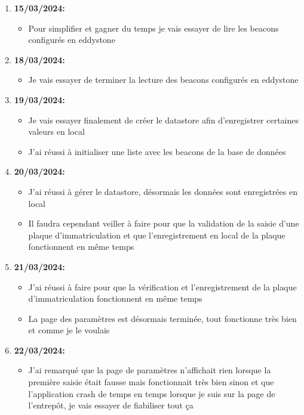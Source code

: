 \documentclass[10pt,a4paper]{book}
\begin{document}
\begin{enumerate}
\begin{itemize}
        \end{itemize}
    \item \textbf{15/03/2024:}
        \begin{itemize}
            \item Pour simplifier et gagner du temps je vais essayer de lire les beacons configurés en eddystone
        \end{itemize}
    \item \textbf{18/03/2024:}
        \begin{itemize}
            \item Je vais essayer de terminer la lecture des beacons configurés en eddystone
        \end{itemize}
    \item \textbf{19/03/2024:}
        \begin{itemize}
            \item Je vais essayer finalement de créer le datastore afin d'enregistrer certaines valeurs en local
            \item J'ai réussi à initialiser une liste avec les beacons de la base de données
        \end{itemize}
    \item \textbf{20/03/2024:}
        \begin{itemize}
            \item J'ai réussi à gérer le datastore, désormais les données sont enregistrées en local
            \item Il faudra cependant veiller à faire pour que la validation de la saisie d'une plaque d'immatriculation et que l'enregistrement en local de la plaque fonctionnent en même temps
        \end{itemize}
    \item \textbf{21/03/2024:}
        \begin{itemize}
            \item J'ai réussi à faire pour que la vérification et l'enregistrement de la plaque d'immatriculation fonctionnent en même temps
            \item La page des paramètres est désormais terminée, tout fonctionne très bien et comme je le voulais
        \end{itemize}
    \item \textbf{22/03/2024:}
        \begin{itemize}
            \item J'ai remarqué que la page de paramètres n'affichait rien lorsque la première saisie était fausse mais fonctionnait très bien sinon et que l'application crash de temps en temps lorsque je suis sur la page de l'entrepôt, je vais essayer de fiabiliser tout ça

\end{itemize}
\end{enumerate}
\end{document}
